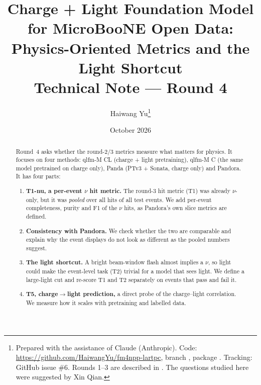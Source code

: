 \documentclass[11pt,a4paper]{article}
\title{\textbf{Charge + Light Foundation Model for MicroBooNE Open Data:\\ Physics-Oriented Metrics and the Light Shortcut}\\[4pt]
\large Technical Note --- Round 4}
\author{Haiwang Yu\thanks{Prepared with the assistance of Claude (Anthropic). Code: \url{https://github.com/HaiwangYu/fm4npp-lartpc}, branch \code{main}, package \code{multi-modal-qlmatch/qlfm}. Tracking: GitHub issue \#6. Rounds 1--3 are described in \code{docs/technote-round\{1,2,3\}.pdf}. The questions studied here were suggested by Xin Qian.}}
\date{October 2026}
\begin{document}
\maketitle

\begin{abstract}
\noindent
Round~4 asks whether the round-2/3 metrics measure what matters for physics. It focuses on four methods: qlfm-M CL (charge + light pretraining), qlfm-M C (the same model pretrained on charge only), Panda (PTv3 + Sonata, charge only) and Pandora. It has four parts:
\begin{enumerate}
  \item \textbf{T1-nu, a per-event $\nu$ hit metric.} The round-3 hit metric (T1) was already $\nu$-only, but it was \emph{pooled} over all hits of all test events. We add per-event completeness, purity and F1 of the $\nu$ hits, as Pandora's own slice metrics are defined.
  \item \textbf{Consistency with Pandora.} We check whether the two are comparable and explain why the event displays do not look as different as the pooled numbers suggest.
  \item \textbf{The light shortcut.} A bright beam-window flash almost implies a $\nu$, so light could make the event-level task (T2) trivial for a model that sees light. We define a large-light cut and re-score T1 and T2 separately on events that pass and fail it.
  \item \textbf{T5, charge$\to$light prediction,} a direct probe of the charge--light correlation. We measure how it scales with pretraining and labelled data.
\end{enumerate}


\end{abstract}
\end{document}

